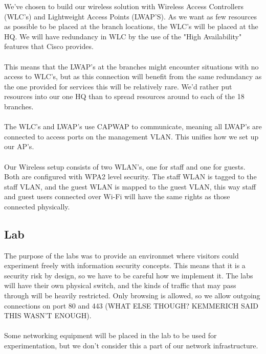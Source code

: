 We've chosen to build our wireless solution with Wireless Access Controllers (WLC's) and Lightweight Access Points (LWAP'S). As we want as few resources as possible to be placed at the branch locations, the WLC's will be placed at the HQ. We will have redundancy in WLC by the use of the "High Availability" features that Cisco provides.
\\
\\
This means that the LWAP's at the branches might encounter situations with no access to WLC's, but as this connection will benefit from the same redundancy as the one provided for services this will be relatively rare. We'd rather put resources into our one HQ than to spread resources around to each of the 18 branches.
\\
\\
The WLC's and LWAP's use CAPWAP to communicate, meaning all LWAP's are connected to access ports on the management VLAN. This unifies how we set up our AP's.
\\
\\
Our Wireless setup consists of two WLAN's, one for staff and one for guests. Both are configured with WPA2 level security. The staff WLAN is tagged to the staff VLAN, and the guest WLAN is mapped to the guest VLAN, this way staff and guest users connected over Wi-Fi will have the same rights as those connected physically.

\subsection{Lab}


The purpose of the labs was to provide an environmet where visitors could experiment freely with information security concepts. This means that it is a security risk by design, so we have to be careful how we implement it. The labs will have their own physical switch, and the kinds of traffic that may pass through will be heavily restricted. Only browsing is allowed, so we allow outgoing connections on port 80 and 443 (WHAT ELSE THOUGH? KEMMERICH SAID THIS WASN'T ENOUGH). 
\\
\\
Some networking equipment will be placed in the lab to be used for experimentation, but we don't consider this a part of our network infrastructure.


